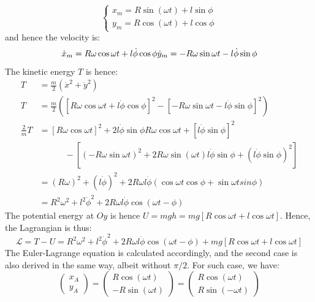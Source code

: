\begin{equation}
    \begin{cases}
        x_{m} = R\sin{(\omega t)} + l \sin{\phi}\\
        y_{m} = R\cos{(\omega t)} + l \cos{\phi}
    \end{cases}
\end{equation}
and hence the velocity is: 
\begin{equation}
    \dot{x}_{m} = R\omega \cos{\omega t} + l \dot{\phi}\cos{\phi}\\
    \dot{y}_{m} = - R\omega \sin{\omega t} - l \dot{\phi}\sin{\phi}
\end{equation}
The kinetic energy $T$ is hence: 
\begin{equation}
    \begin{split}
        T 
        & = \frac{m}{2} (\dot{x}^{2} + \dot{y}^{2})\\
        T & = \frac{m}{2}\left( \left[ R\omega \cos{\omega t} + l \dot{\phi}\cos{\phi}  \right]^{2} - \left[ - R\omega \sin{\omega t} - l \dot{\phi}\sin{\phi} \right]^{2}\right)\\
        \frac{2}{m}T& = \left[R\omega \cos{\omega t}\right]^{2} + 2l \dot{\phi} \sin{\phi} R\omega \cos{\omega t} + \left[ l\dot{\phi}\sin{\phi} \right]^{2}  \\
        & \quad \quad \quad -\left[ \left(-R\omega \sin{\omega t}\right)^{2} + 2R\omega \sin{(\omega t)} l \dot{\phi}\sin{\phi} + \left(l \dot{\phi}\sin{\phi}\right)^{2} \right]\\
        & = (R\omega)^{2} + (l \dot{\phi})^{2} + 2R\omega l\dot{\phi} (\cos{\omega t}\cos{\phi} + \sin{\omega t}sin{\phi})\\
        & = R^{2}\omega^{2} + l^{2}\dot{\phi}^{2} + 2R \omega l\dot{\phi}\cos{(\omega t - \phi)} 
    \end{split}
\end{equation}
The potential energy at $Oy$ is hence $U=mgh  =mg\left[R\cos{\omega t}+ l \cos{\omega t}\right]$. Hence, the Lagrangian is thus: 
\begin{equation}
    \mathcal{L} = T- U = R^{2}\omega^{2} + l^{2}\dot{\phi}^{2} + 2R \omega l\dot{\phi}\cos{(\omega t - \phi)} + mg\left[R\cos{\omega t}+ l \cos{\omega t}\right] 
\end{equation}
The Euler-Lagrange equation is calculated accordingly, and the second case is also derived in the same way, albeit without $\pi/2$. For such case, we have: 
\begin{equation}
    \begin{pmatrix}
        x_{A} \\
        y_{A}
    \end{pmatrix}
    = \begin{pmatrix}
        R\cos{(\omega t)} \\
        - R\sin{(\omega t)}
    \end{pmatrix} = 
    \begin{pmatrix}
        R\cos{(\omega t)}\\
        R\sin{(-\omega t)}
    \end{pmatrix}
\end{equation}
